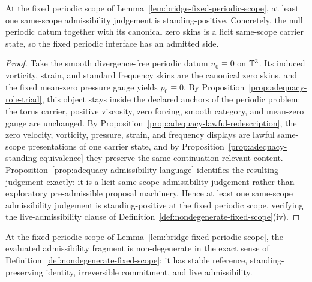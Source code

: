 \begin{manuallemma}
\label{lem:bridge-periodic-live-admissibility}
At the fixed periodic scope of Lemma~\ref{lem:bridge-fixed-periodic-scope}, at least one same-scope admissibility judgement is standing-positive. Concretely, the null periodic datum together with its canonical zero skins is a licit same-scope carrier state, so the fixed periodic interface has an admitted side.
\end{manuallemma}

\begin{proof}
Take the smooth divergence-free periodic datum $u_0\equiv 0$ on $\mathbb{T}^3$. Its induced vorticity, strain, and standard frequency skins are the canonical zero skins, and the fixed mean-zero pressure gauge yields $p_0\equiv 0$. By Proposition~\ref{prop:adequacy-role-triad}, this object stays inside the declared anchors of the periodic problem: the torus carrier, positive viscosity, zero forcing, smooth category, and mean-zero gauge are unchanged. By Proposition~\ref{prop:adequacy-lawful-redescription}, the zero velocity, vorticity, pressure, strain, and frequency displays are lawful same-scope presentations of one carrier state, and by Proposition~\ref{prop:adequacy-standing-equivalence} they preserve the same continuation-relevant content. Proposition~\ref{prop:adequacy-admissibility-language} identifies the resulting judgement exactly: it is a licit same-scope admissibility judgement rather than exploratory pre-admissible proposal machinery. Hence at least one same-scope admissibility judgement is standing-positive at the fixed periodic scope, verifying the live-admissibility clause of Definition~\ref{def:nondegenerate-fixed-scope}(iv).
\end{proof}

\begin{manuallemma}
\label{lem:bridge-periodic-nondegeneracy}
At the fixed periodic scope of Lemma~\ref{lem:bridge-fixed-periodic-scope}, the evaluated admissibility fragment is non-degenerate in the exact sense of Definition~\ref{def:nondegenerate-fixed-scope}: it has stable reference, standing-preserving identity, irreversible commitment, and live admissibility.
\end{manuallemma}

